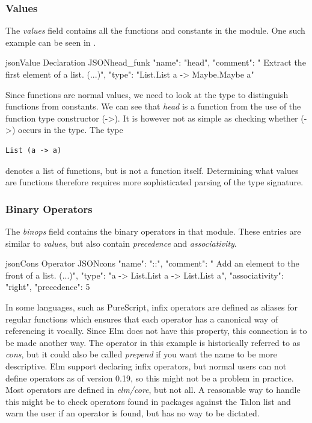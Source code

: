 \documentclass[../thesis.tex]{subfiles}
\begin{document}
\subsubsection{Values}\label{values}
The \textit{values} field contains all the functions and constants in the module.
One such example can be seen in .
\begin{code}{json}{Value Declaration JSON}{head_funk}
{
  "name": "head",
  "comment": " Extract the first element of a list. (...)",
  "type": "List.List a -> Maybe.Maybe a"
}
\end{code}
Since functions are normal values, we need to look at the type to distinguish functions from constants.
We can see that \textit{head} is a function from the use of the function type constructor (->).
It is however not as simple as checking whether (->) occurs in the type.
The type
\begin{verbatim}
List (a -> a)
\end{verbatim}
denotes a list of functions, but is not a function itself.
Determining what values are functions therefore requires more sophisticated parsing of the type signature.

\subsubsection{Binary Operators}\label{binary_operators}
The \textit{binops} field contains the binary operators in that module.
These entries are similar to \textit{values}, but also contain \textit{precedence} and \textit{associativity}.
\begin{code}{json}{Cons Operator JSON}{cons}
{
  "name": "::",
  "comment": " Add an element to the front of a list. (...)",
  "type": "a -> List.List a -> List.List a",
  "associativity": "right",
  "precedence": 5
}
\end{code}
In some languages, such as PureScript, infix operators are defined as aliases
for regular functions which ensures that each operator has a canonical way of referencing it vocally.
Since Elm does not have this property, this connection is to be made another way.
The operator in this example is historically referred to as \textit{cons}, but it could also be called
\textit{prepend} if you want the name to be more descriptive.
Elm support declaring infix operators, but normal users can not define operators as of version 0.19, so this might not be a problem in practice.
Most operators are defined in \textit{elm/core}, but not all.%
A reasonable way to handle this might be to check operators found in packages against the Talon list
and warn the user if an operator is found, but has no way to be dictated.
\end{document}

